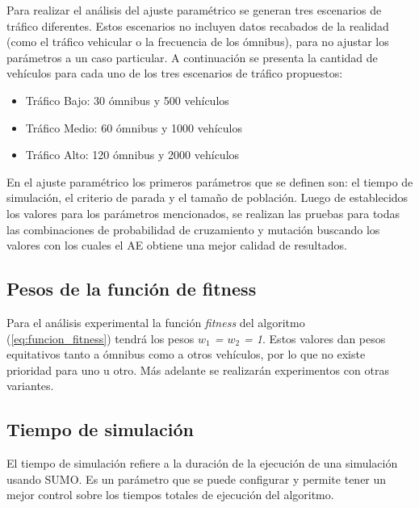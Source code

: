 Para realizar el análisis del ajuste paramétrico se generan tres escenarios de tráfico diferentes. Estos escenarios no incluyen datos recabados de la realidad (como el tráfico vehicular o la frecuencia de los ómnibus), para no ajustar los parámetros a un caso particular.
A continuación se presenta la cantidad de vehículos para cada uno de los tres escenarios de tráfico propuestos:

\begin{itemize}
	\item Tráfico Bajo: 30 ómnibus y 500 vehículos	
	\item Tráfico Medio: 60 ómnibus y 1000 vehículos
	\item Tráfico Alto: 120 ómnibus y 2000 vehículos
\end{itemize}


En el ajuste paramétrico los primeros parámetros que se definen son: el tiempo de simulación, el criterio de parada y el tamaño de población. Luego de establecidos los valores para los parámetros mencionados, se realizan las pruebas para todas las combinaciones de probabilidad de cruzamiento y mutación buscando los valores con los cuales el AE obtiene una mejor calidad de resultados.


\subsection{Pesos de la función de fitness}

Para el análisis experimental la función \emph{fitness} del algoritmo (\ref{eq:funcion_fitness}) tendrá los pesos \emph{$w_1$ = $w_2$ = 1}. Estos valores dan pesos equitativos tanto a ómnibus como a otros vehículos, por lo que no existe prioridad para uno u otro. Más adelante se realizarán experimentos con otras variantes.


\subsection{Tiempo de simulación}
El tiempo de simulación refiere a la duración de la ejecución de una simulación usando SUMO. Es un parámetro que se puede configurar y permite tener un mejor control sobre los tiempos totales de ejecución del algoritmo.


